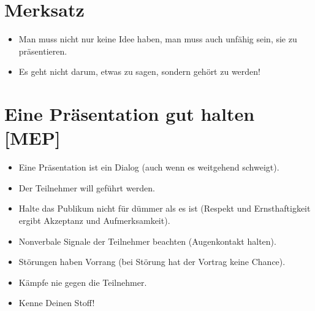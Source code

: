 \section{Merksatz}
\begin{itemize}
	\item Man muss nicht nur keine Idee haben, man muss auch unfähig sein, sie zu präsentieren.
	\item Es geht nicht darum, etwas zu sagen, sondern gehört zu werden!
\end{itemize}

\section{Eine Präsentation gut halten [MEP]}
\begin{itemize}
	\item Eine Präsentation ist ein Dialog (auch wenn es weitgehend schweigt).
	\item Der Teilnehmer will geführt werden.
	\item Halte das Publikum nicht für dümmer als es ist (Respekt und Ernsthaftigkeit ergibt Akzeptanz und Aufmerksamkeit).
	\item Nonverbale Signale der Teilnehmer beachten (Augenkontakt halten). 
	\item Störungen haben Vorrang (bei Störung hat der Vortrag keine Chance).
	\item Kämpfe nie gegen die Teilnehmer.
	\item Kenne Deinen Stoff!
\end{itemize}

